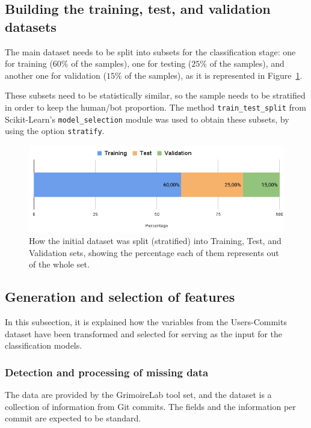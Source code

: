 \documentclass[a4paper, 12pt]{book}
\begin{document}
\subsection{Building the training, test, and validation datasets}
\label{ssec:build-training-datasets}

The main dataset needs to be split into subsets for the classification stage: one for training ($60\%$ of the samples), one for testing ($25\%$ of the samples), and another one for validation ($15\%$ of the samples), as it is represented in Figure~\ref{fig:dataset-percentages}. 

These subsets need to be statistically similar, so the sample needs to be stratified in order to keep the human/bot proportion. The method \texttt{train\_test\_split} from Scikit-Learn's \texttt{model\_selection} module was used to obtain these subsets, by using the option \texttt{stratify}.

\begin{figure}
 \centering
  \includegraphics[width=16cm, keepaspectratio]{img/dataset-percentages.png}
  \caption{How the initial dataset was split (stratified) into Training, Test, and Validation sets, showing the percentage each of them represents out of the whole set.}
  \label{fig:dataset-percentages}
\end{figure}

\subsection{Generation and selection of features}
\label{ssec:selection-features}

In this subsection, it is explained how the variables from the Users-Commits dataset have been transformed and selected for serving as the input for the classification models.

\subsubsection{Detection and processing of missing data}
\label{sssec:missing-data}
The data are provided by the GrimoireLab tool set, and the dataset is a collection of information from Git commits. The fields and the information per commit are expected to be standard. 
\end{document}
